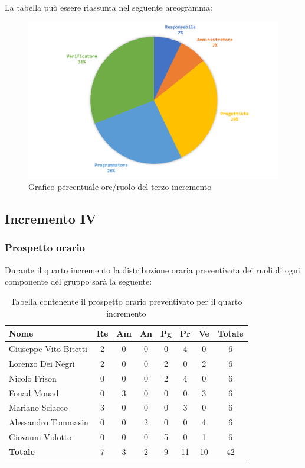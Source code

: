 		La tabella può essere riassunta nel seguente areogramma:
		\begin{figure}[H]
			\centering
			\includegraphics[width=0.8\linewidth]{./images/preventivo/incremento3-2.png}
			\caption{Grafico percentuale ore/ruolo del terzo incremento}
			\label{fig:grafico costi ruolo incremento III}
		\end{figure}
		
		
		
	\subsection{Incremento IV}
		\subsubsection{Prospetto orario}
		Durante il quarto incremento la distribuzione oraria preventivata dei ruoli di ogni componente del gruppo sarà la seguente:
		
		\begin{longtable}{|l|c|c|c|c|c|c|c|}
			\hline
			\rowcolor{lighter-grayer}
			\textbf{Nome} & \textbf{Re} & \textbf{Am} & \textbf{An} & \textbf{Pg}  & \textbf{Pr}   & \textbf{Ve} & \textbf{Totale} \\
			\hline
			\endfirsthead
			
			\hline
			Giuseppe Vito Bitetti 		 & 2 & 0 & 0 & 0 & 4 & 0 & 6\\
			\hline
			\hline
			Lorenzo Dei Negri			 & 2 & 0 & 0 & 2 & 0 & 2 & 6\\
			\hline
			\hline
			Nicolò Frison				    & 0 & 0 & 0 & 2 & 4 & 0 & 6\\
			\hline
			\hline
			Fouad Mouad 				 & 0 & 3 & 0 & 0 & 0 & 3 & 6\\
			\hline
			\hline
			Mariano Sciacco 			 & 3 & 0 & 0 & 0 & 3 & 0 & 6\\
			\hline
			\hline
			Alessandro Tommasin     & 0 & 0 & 2 & 0 & 0 & 4 & 6\\
			\hline
			\hline
			Giovanni Vidotto 			 & 0 & 0 & 0 & 5 & 0 & 1 & 6\\
			\hline 
			\textbf{Totale}			 		& 7 & 3 & 2 & 9 & 11 & 10 & 42\\
			\hline
			\caption{Tabella contenente il prospetto orario preventivato per il quarto incremento}
		\end{longtable}
		\pagebreak
		
